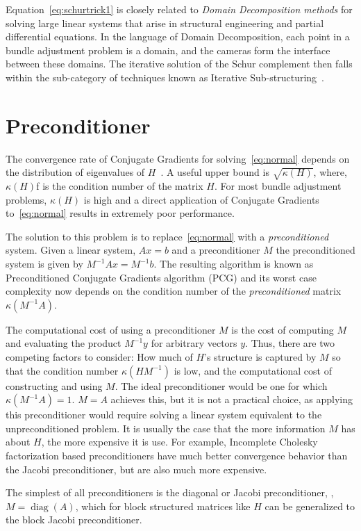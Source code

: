 Equation~\eqref{eq:schurtrick1} is closely related to {\em Domain Decomposition methods} for solving large linear systems that arise in structural engineering and partial differential equations. In the language of Domain Decomposition, each point in a bundle adjustment problem is a domain, and the cameras form the interface between these domains. The iterative solution of the Schur complement then falls within the sub-category of techniques known as Iterative Sub-structuring~\cite{saad2003iterative,mathew2008domain}.

\section{Preconditioner}
The convergence rate of Conjugate Gradients  for solving~\eqref{eq:normal} depends on the distribution of eigenvalues of $H$~\cite{saad2003iterative}. A useful upper bound is $\sqrt{\kappa(H)}$, where, $\kappa(H)$f is the condition number of the matrix $H$. For most bundle adjustment problems, $\kappa(H)$ is high and a direct application of Conjugate Gradients to~\eqref{eq:normal} results in extremely poor performance.

The solution to this problem is to replace~\eqref{eq:normal} with a {\em preconditioned} system.  Given a linear system, $Ax =b$ and a preconditioner $M$ the preconditioned system is given by $M^{-1}Ax = M^{-1}b$. The resulting algorithm is known as Preconditioned Conjugate Gradients algorithm (PCG) and its  worst case complexity now depends on the condition number of the {\em preconditioned} matrix $\kappa(M^{-1}A)$.

The computational cost of using a preconditioner $M$ is the cost of computing $M$ and evaluating the product $M^{-1}y$ for arbitrary vectors $y$. Thus, there are two competing factors to consider: How much of $H$'s structure is captured by $M$ so that the condition number $\kappa(HM^{-1})$ is low, and the computational cost of constructing and using $M$.  The ideal preconditioner would be one for which $\kappa(M^{-1}A) =1$. $M=A$ achieves this, but it is not a practical choice, as applying this preconditioner would require solving a linear system equivalent to the unpreconditioned problem.  It is usually the case that the more information $M$ has about $H$, the more expensive it is use. For example, Incomplete Cholesky factorization based preconditioners  have much better convergence behavior than the Jacobi preconditioner, but are also much more expensive.

The simplest of all preconditioners is the diagonal or Jacobi preconditioner, \ie,  $M=\operatorname{diag}(A)$, which for block structured matrices like $H$ can be generalized to the block Jacobi preconditioner.

